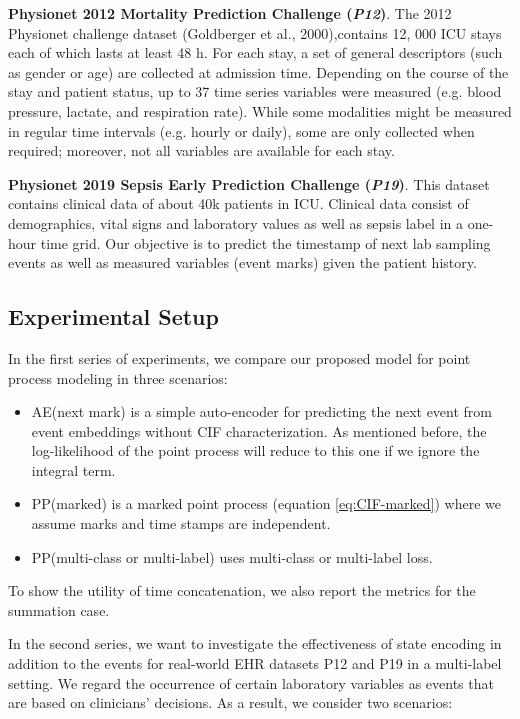 \documentclass[journal,twoside,web]{ieeecolor}
\begin{document}
\textbf{Physionet 2012 Mortality Prediction Challenge (\emph{P12})}.
The 2012 Physionet challenge dataset (Goldberger et al., 2000),contains 12, 000 ICU stays each of which lasts at least 48 h. For each stay, a set of general descriptors (such as gender or age) are collected at admission time. Depending on the course of the stay and patient status, up to 37 time series variables were measured (e.g. blood pressure, lactate, and respiration rate). While some modalities might be measured in regular time intervals (e.g. hourly or daily), some are only collected when required; moreover, not all variables are available for each stay.

\textbf{Physionet 2019 Sepsis Early Prediction Challenge (\emph{P19})}.
This dataset contains clinical data of about 40k patients in ICU. Clinical data consist of demographics, vital signs and laboratory values as well as sepsis label in a one-hour time grid. Our objective is to predict the timestamp of next lab sampling events as well as measured variables (event marks) given the patient history.



\subsection*{Experimental Setup}

In the first series of experiments, we compare our proposed model for point process modeling in three scenarios:

\begin{itemize}
    \item AE(next mark) is a simple auto-encoder for predicting the next event from event embeddings without CIF characterization. As mentioned before, the log-likelihood of the point process will reduce to this one if we ignore the integral term.
    \item PP(marked) is a marked point process (equation \ref*{eq:CIF-marked}) where we assume marks and time stamps are independent.
    \item PP(multi-class or multi-label) uses multi-class or multi-label loss.
\end{itemize}

To show the utility of time concatenation, we also report the metrics for the summation case.

In the second series, we want to investigate the effectiveness of state encoding in addition to the events for real-world EHR datasets P12 and P19 in a multi-label setting. We regard the occurrence of certain laboratory variables as events that are based on clinicians' decisions. As a result, we consider two scenarios:
\end{document}
